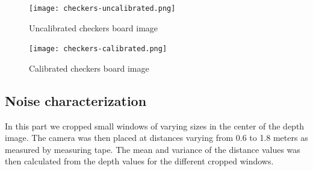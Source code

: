 \documentclass[DIV12,a4paper]{scrartcl}
\begin{document}
\begin{figure}[h!tbp]
  \centering
  \texttt{[image: checkers-uncalibrated.png]}
  \caption{Uncalibrated checkers board image}
  \label{fig:checkers_board_uncalibrated}
\end{figure}
\begin{figure}[h!tbp]
  \centering
  \texttt{[image: checkers-calibrated.png]}
  \caption{Calibrated checkers board image}
  \label{fig:checkers_board_calibrated}
\end{figure}

\newpage
\subsection{Noise characterization}
\label{sec:noise_characterization}
In this part we cropped small windows of varying sizes in the center of the depth image. The camera was then placed at distances varying from 0.6 to 1.8 meters as measured by measuring tape. The mean and variance of the distance values was then calculated from the depth values for the different cropped windows.
\end{document}
